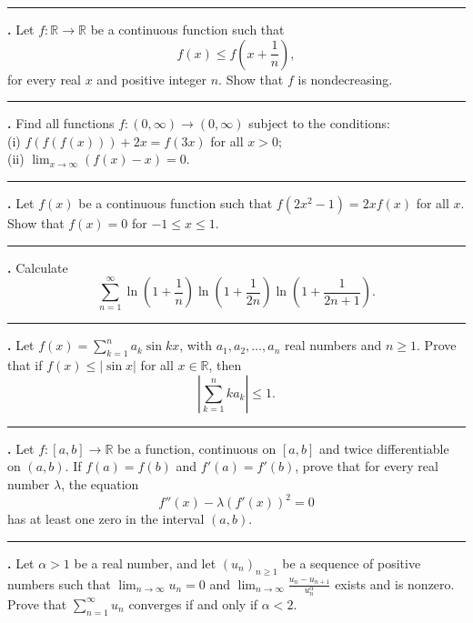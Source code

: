 \documentclass[11pt]{article}
\newcounter{probnum}
\newenvironment{problembox}{\par\noindent\rule{\linewidth}{0.5pt}\vspace{5pt}\par}{\vspace{2pt}}
\begin{document}
\begin{problembox}
\textbf{\theprobnum.} Let $f : \mathbb{R} \to \mathbb{R}$ be a continuous function such that
\[
f(x) \le f\left(x + \frac{1}{n}\right),
\]
for every real $x$ and positive integer $n$. Show that $f$ is nondecreasing.
\end{problembox}

\begin{problembox}
\textbf{\theprobnum.} Find all functions $f : (0,\infty) \to (0,\infty)$ subject to the conditions:\\
(i) $f(f(f(x))) + 2x = f(3x)$ for all $x > 0$;\\
(ii) $\displaystyle\lim_{x \to \infty} (f(x) - x) = 0$.
\end{problembox}

\begin{problembox}
\textbf{\theprobnum.} Let $f(x)$ be a continuous function such that $f(2x^2-1) = 2xf(x)$ for all $x$. Show that $f(x) = 0$ for $-1 \le x \le 1$.
\end{problembox}

\begin{problembox}
\textbf{\theprobnum.} Calculate
\[
\sum_{n=1}^{\infty} \ln\left(1+\frac{1}{n}\right) \ln\left(1+\frac{1}{2n}\right) \ln\left(1+\frac{1}{2n+1}\right).
\]
\end{problembox}

\begin{problembox}
\textbf{\theprobnum.} Let $f(x) = \displaystyle\sum_{k=1}^{n} a_k \sin kx$, with $a_1, a_2, \ldots, a_n$ real numbers and $n \ge 1$. Prove that if $f(x) \le |\sin x|$ for all $x \in \mathbb{R}$, then
\[
\left|\sum_{k=1}^{n} k a_k\right| \le 1.
\]
\end{problembox}

\begin{problembox}
\textbf{\theprobnum.} Let $f : [a,b] \to \mathbb{R}$ be a function, continuous on $[a,b]$ and twice differentiable on $(a,b)$. If $f(a) = f(b)$ and $f'(a) = f'(b)$, prove that for every real number $\lambda$, the equation
\[
f''(x) - \lambda (f'(x))^2 = 0
\]
has at least one zero in the interval $(a,b)$.
\end{problembox}

\begin{problembox}
\textbf{\theprobnum.} Let $\alpha > 1$ be a real number, and let $(u_n)_{n \ge 1}$ be a sequence of positive numbers such that $\displaystyle\lim_{n \to \infty} u_n = 0$ and $\displaystyle\lim_{n \to \infty} \frac{u_n - u_{n+1}}{u_n^{\alpha}}$ exists and is nonzero. Prove that $\displaystyle\sum_{n=1}^{\infty} u_n$ converges if and only if $\alpha < 2$.
\end{problembox}
\end{document}
